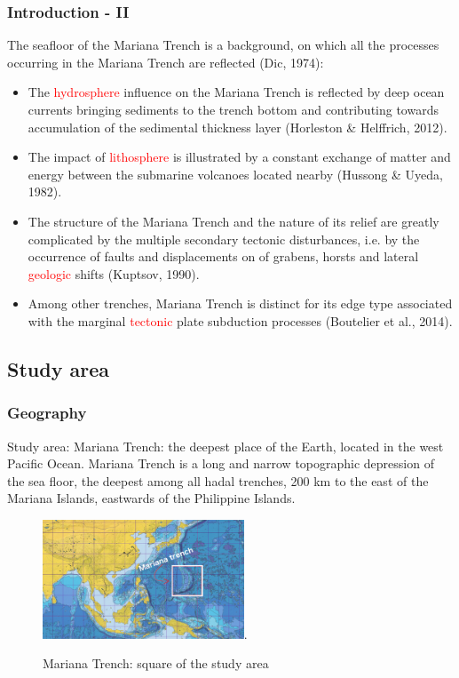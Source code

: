 \documentclass[pdflatex,compress,10pt,
	xcolor={dvipsnames,dvipsnames,svgnames,x11names,table},
	hyperref={colorlinks = true,breaklinks = true, urlcolor = NavyBlue, breaklinks = true}]{beamer}
\begin{document}
\begin{frame}\frametitle{Introduction - II}
The seafloor of the Mariana Trench is a \textcolor{NavyBlue}{background}, on which all the processes occurring in the Mariana Trench are reflected (Dic, 1974):
 \begin{itemize}
	\item The \textcolor{red}{hydrosphere} influence on the Mariana Trench is reflected by deep ocean currents bringing sediments to the trench bottom and contributing towards accumulation of the sedimental thickness layer (Horleston \& Helffrich, 2012).
	\item The impact of \textcolor{red}{lithosphere} is illustrated by a constant exchange of matter and energy between the submarine volcanoes located nearby (Hussong \& Uyeda, 1982).
	\item The structure of the Mariana Trench and the nature of its relief are greatly complicated by the multiple secondary tectonic disturbances, i.e. by the occurrence of faults and displacements on of grabens, horsts and lateral \textcolor{red}{geologic} shifts (Kuptsov, 1990). 		
	\item Among other trenches, Mariana Trench is distinct for its edge type associated with the marginal \textcolor{red}{tectonic} plate subduction processes (Boutelier et al., 2014). 
 \end{itemize} 
 
\end{frame}

\subsection{Study area}

\begin{frame}\frametitle{Geography}
Study area: Mariana Trench: the deepest place of the Earth, located in the west Pacific Ocean. Mariana Trench is a long and narrow topographic depression of the sea floor, the deepest among all hadal trenches, 200 km to the east of the Mariana Islands, eastwards of the Philippine Islands.
\begin{figure}[H]
	\centering
		\includegraphics[width=6cm]{Fig-1.jpg}.
		\caption{Mariana Trench: square of the study area}
\end{figure}
\end{frame}
\end{document}
